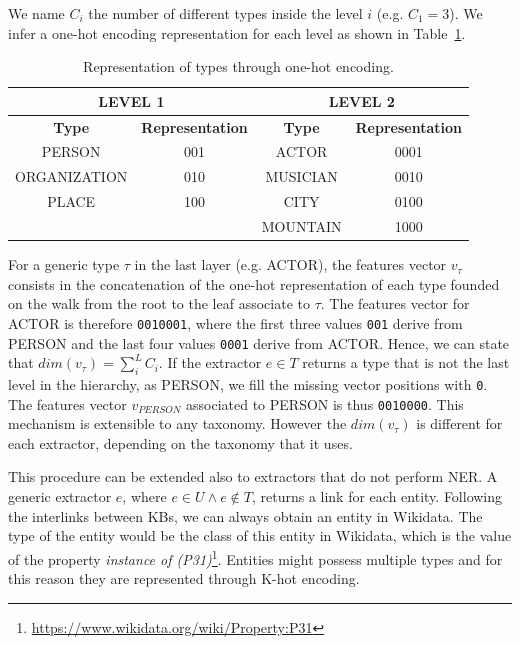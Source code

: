 \documentclass{llncs}
\newcommand{\tabref}[1]{\mbox{Table~\ref{#1}}}
\begin{document}
We name $C_i$ the number of different types inside the level $i$ (e.g. $C_1 = 3$). We infer a one-hot encoding representation for each level as shown in \tabref{tab:onehottype}.

\begin{table}[t]
\centering
\label{tab:onehottype}
\begin{tabular}{|c|c|c|c|}
\hline
\multicolumn{2}{|c|}{\textbf{LEVEL 1}} & \multicolumn{2}{|c|}{\textbf{LEVEL 2}} \\ \hline
\textbf{Type}  & \textbf{Representation}  & \textbf{Type}  & \textbf{Representation}    \\ \hline
PERSON          & 001   & ACTOR     & 0001  \\ \hline
ORGANIZATION    & 010   & MUSICIAN  & 0010  \\ \hline
PLACE           & 100   & CITY      & 0100  \\ \hline
      &       & MOUNTAIN  & 1000  \\ \hline
\end{tabular}
\bigskip
\caption{Representation of types through one-hot encoding.}
\end{table}

For a generic type $\tau$ in the last layer (e.g. ACTOR), the features vector $v_{\tau}$ consists in the concatenation of the one-hot representation of each type founded on the walk from the root to the leaf associate to $\tau$. The features vector for ACTOR is therefore  \texttt{0010001}, where the first three values \texttt{001} derive from PERSON and the last four values \texttt{0001} derive from ACTOR. Hence, we can state that $dim(v_{\tau})= \sum_{i}^{L}C_i$. If the extractor $e \in T$ returns a type that is not the last level in the hierarchy, as PERSON, we fill the missing vector positions with \texttt{0}. The features vector $v_{PERSON}$ associated to PERSON is thus \texttt{0010000}. This mechanism is extensible to any taxonomy. However the $dim(v_{\tau})$ is different for each extractor, depending on the taxonomy that it uses. 

This procedure can be extended also to extractors that do not perform NER. A generic extractor $e$, where $e \in U \wedge e \not\in T$, returns a link for each entity. Following the interlinks between KBs, we can always obtain an entity in Wikidata. The type of the entity would be the class of this entity in Wikidata, which is the value of the property \textit{instance of (P31)}\footnote{\label{P31} \url{https://www.wikidata.org/wiki/Property:P31}}. Entities might possess multiple types and for this reason they are represented through K-hot encoding.
\end{document}
